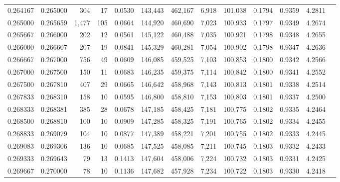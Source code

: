\begin{tabular}{rrrrrrrrrrrrr}
0.264167 & 0.265000 &   304 &  17 &                                     0.0530 & 143,443 & 462,167 &   6,918 & 101,038 & 0.1794 & 0.9359 & 4.2811 \\
0.265000 & 0.265659 & 1,477 & 105 &                                     0.0664 & 144,920 & 460,690 &   7,023 & 100,933 & 0.1797 & 0.9349 & 4.2674 \\
0.265667 & 0.266000 &   202 &  12 &                                     0.0561 & 145,122 & 460,488 &   7,035 & 100,921 & 0.1798 & 0.9348 & 4.2655 \\
0.266000 & 0.266607 &   207 &  19 &                                     0.0841 & 145,329 & 460,281 &   7,054 & 100,902 & 0.1798 & 0.9347 & 4.2636 \\
0.266667 & 0.267000 &   756 &  49 &                                     0.0609 & 146,085 & 459,525 &   7,103 & 100,853 & 0.1800 & 0.9342 & 4.2566 \\
0.267000 & 0.267500 &   150 &  11 &                                     0.0683 & 146,235 & 459,375 &   7,114 & 100,842 & 0.1800 & 0.9341 & 4.2552 \\
0.267500 & 0.267810 &   407 &  29 &                                     0.0665 & 146,642 & 458,968 &   7,143 & 100,813 & 0.1801 & 0.9338 & 4.2514 \\
0.267833 & 0.268310 &   158 &  10 &                                     0.0595 & 146,800 & 458,810 &   7,153 & 100,803 & 0.1801 & 0.9337 & 4.2500 \\
0.268333 & 0.268381 &   385 &  28 &                                     0.0678 & 147,185 & 458,425 &   7,181 & 100,775 & 0.1802 & 0.9335 & 4.2464 \\
0.268500 & 0.268810 &   100 &  10 &                                     0.0909 & 147,285 & 458,325 &   7,191 & 100,765 & 0.1802 & 0.9334 & 4.2455 \\
0.268833 & 0.269079 &   104 &  10 &                                     0.0877 & 147,389 & 458,221 &   7,201 & 100,755 & 0.1802 & 0.9333 & 4.2445 \\
0.269083 & 0.269306 &   136 &  10 &                                     0.0685 & 147,525 & 458,085 &   7,211 & 100,745 & 0.1803 & 0.9332 & 4.2433 \\
0.269333 & 0.269643 &    79 &  13 &                                     0.1413 & 147,604 & 458,006 &   7,224 & 100,732 & 0.1803 & 0.9331 & 4.2425 \\
0.269667 & 0.270000 &    78 &  10 &                                     0.1136 & 147,682 & 457,928 &   7,234 & 100,722 & 0.1803 & 0.9330 & 4.2418 \\

\end{tabular}

